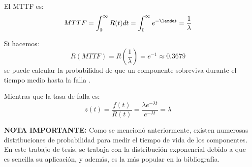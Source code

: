 El \ac{MTTF} es: $$MTTF = \int_0^\infty R(t)dt = \int_0^\infty e^{-\lamda t} = \frac{1}{\lambda}$$

Si hacemos: $$R(MTTF) = R(\frac{1}{\lambda}) = e^{-1}\approx 0.3679$$  se puede calcular la probabilidad de que un componente sobreviva durante el
tiempo medio hasta la falla \citep{Rausand04}.

Mientras que la tasa de falla es: $$z(t) = \frac{f(t)}{R(t)} = \frac{\lambda e^{-\lambda t}}{e^{-\lambda t}} = \lambda $$

\textbf{NOTA IMPORTANTE:} Como se mencionó anteriormente, existen numerosas distribuciones
de probabilidad para medir el tiempo de vida de los componentes. En este trabajo de tesis,
se trabaja con la distribución exponencial debido a que es sencilla su aplicación, y además,
es la más popular en la bibliografía.
